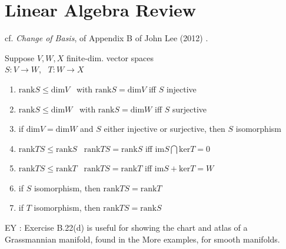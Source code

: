\part{Linear Algebra Review}


cf. \emph{Change of Basis}, of Appendix B of  John Lee (2012) \cite{dgdt:JLee2012}.  

 Suppose $V,W, X$ finite-dim. vector spaces \\
$S:V\to W$, \, $T:W \to X$

\begin{enumerate}
	\item[(a)] $\text{rank}S \leq \text{dim}V$ \quad \, with $\text{rank}S = \text{dim}V$ iff $S$ injective
	\item[(b)] $\text{rank}S \leq \text{dim}W$ \quad \, with $\text{rank}S = \text{dim}W$ iff $S$ surjective
	\item[(c)] if $\text{dim}V = \text{dim}W$ and $S$ either injective or surjective, then $S$ isomorphism 
	\item[(d)] $\text{rank}TS \leq \text{rank}S$ \quad \, $\text{rank}TS = \text{rank}S$ iff $\text{im}S \bigcap \text{ker}T = 0$ 
	\item[(e)] $\text{rank}TS \leq \text{rank}T$ \quad \, $\text{rank}TS = \text{rank}T$ iff $\text{im}S + \text{ker}T = W$
	\item[(f)] if $S$ isomorphism, then $\text{rank}TS = \text{rank}T$
	\item[(g)] if $T$ isomorphism, then $\text{rank}TS = \text{rank}S$
\end{enumerate}

EY : Exercise B.22(d) is useful for showing the chart and atlas of a Grassmannian manifold, found in the More examples, for smooth manifolds.  

